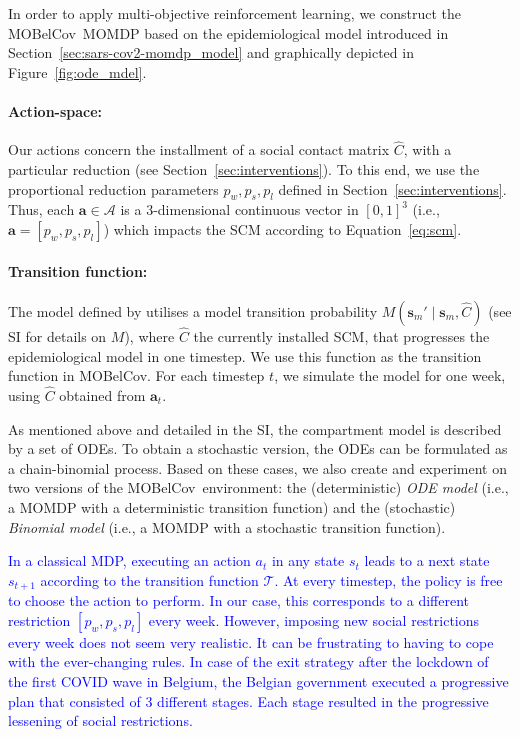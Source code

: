 \documentclass{article}
\newcommand\added[1]{\textcolor{blue}{#1}}
\newcommand{\mdpactionspace}{\mathcal{A}}
\newcommand{\mdptransition}{\mathcal{T}}
\newcommand{\state}{s}
\newcommand{\mdpstate}{\mathbf{s}}
\newcommand{\action}{a}
\newcommand{\mdpaction}{\mathbf{a}}
\newcommand{\momdpname}{MOBelCov}
\begin{document}
In order to apply multi-objective reinforcement learning, we construct the \momdpname\ MOMDP based on the epidemiological model introduced in Section~\ref{sec:sars-cov2-momdp_model} and graphically depicted in Figure~\ref{fig:ode_mdel}.

\paragraph{Action-space:} Our actions concern the installment of a social contact matrix $\hat{C}$, with a particular reduction (see Section~\ref{sec:interventions}). To this end, we use the proportional reduction parameters $p_w, p_s, p_l$ defined in Section~\ref{sec:interventions}. Thus, each $\mdpaction \in \mdpactionspace$ is a 3-dimensional continuous vector in $[0,1]^3$ (i.e., $\mdpaction = [p_{w}, p_{s}, p_{l}]$) which impacts the SCM according to Equation~\ref{eq:scm}.

\paragraph{Transition function:} The model defined by \citet{abrams2021modelling} utilises a model transition probability $M(\mdpstate_m' \mid \mdpstate_m, \hat{C})$ (see SI for details on $M$), where $\hat{C}$ the currently installed SCM, that progresses the epidemiological model in one timestep.
We use this function as the transition function in \momdpname.
For each timestep $t$, we simulate the model for one week, using $\hat{C}$ obtained from $\mdpaction_t$.

As mentioned above and detailed in the SI, the compartment model is described by a set of ODEs. To obtain a stochastic version, the ODEs can be formulated as a chain-binomial process. Based on these cases, we also create and experiment on two versions of the \momdpname\ environment: the (deterministic) \emph{ODE model} (i.e., a MOMDP with a deterministic transition function) and the (stochastic) \emph{Binomial model} (i.e., a MOMDP with a stochastic transition function).

\added{In a classical MDP, executing an action $\action_t$ in any state $\state_t$ leads to a next state $\state_{t+1}$ according to the transition function $\mdptransition$. At every timestep, the policy is free to choose the action to perform. In our case, this corresponds to a different restriction $[p_{w}, p_{s}, p_{l}]$ every week. However, imposing new social restrictions every week does not seem very realistic. It can be frustrating to having to cope with the ever-changing rules. In case of the exit strategy after the lockdown of the first COVID wave in Belgium, the Belgian government executed a progressive plan that consisted of 3 different stages. Each stage resulted in the progressive lessening of social restrictions.}
\end{document}
